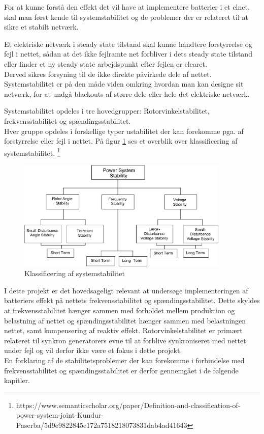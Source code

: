 
\label{Systemstabilitet}
For at kunne forstå den effekt det vil have at implementere batterier i et elnet, skal man først kende til systemstabilitet og de problemer der er relateret til at sikre et stabilt netværk.

Et elektriske netværk i steady state tilstand skal kunne håndtere forstyrrelse og fejl i nettet, sådan at det ikke fejlramte net forbliver i dets steady state tilstand eller finder et ny steady state arbejdspunkt efter fejlen er clearet.\\
Derved sikres forsyning til de ikke direkte påvirkede dele af nettet. Systemstabilitet er på den måde viden omkring hvordan man kan designe sit netværk, for at undgå blackouts af større dele eller hele det elektriske netværk.

Systemstabilitet opdeles i tre hovedgrupper: Rotorvinkelstabilitet, frekvensstabilitet og spændingsstabilitet.\\
Hver gruppe opdeles i forskellige typer ustabilitet der kan forekomme pga. af forstyrrelse eller fejl i nettet. På figur \ref{fig:Overview} ses et overblik over klassificering af systemstabilitet.
\footnote{https://www.semanticscholar.org/paper/Definition-and-classification-of-power-system-joint-Kundur-Paserba/5d9e9822845e172a7518218073831dab4ad41643}

\begin{figure}[H] %
	\centering
	\includegraphics[width=0.9\textwidth]{figurer/Classification_of_power_system_stability}
	\caption{Klassificering af systemstabilitet}
	\label{fig:Overview}
\end{figure}

I dette projekt er det hovedsageligt relevant at undersøge implementeringen af batteriers effekt på nettets frekvensstabilitet og spændingsstabilitet. Dette skyldes at frekvensstabilitet hænger sammen med forholdet mellem produktion og belastning af nettet og spændingsstabilitet hænger sammen med belastningen nettet, samt kompensering af reaktiv effekt. Rotorvinkelstabilitet er primært relateret til synkron generatorers evne til at forblive synkroniseret med nettet under fejl og vil derfor ikke være et fokus i dette projekt. \\
En forklaring af de stabilitetsproblemer der kan forekomme i forbindelse med frekvensstabilitet og spændingsstabilitet er derfor gennemgået i de følgende kapitler.